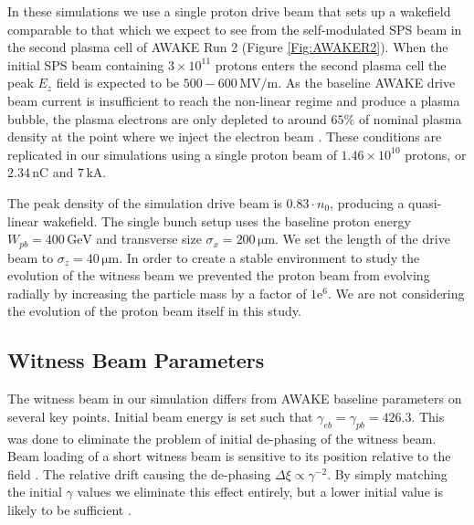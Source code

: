 \documentclass[aps,prstab,reprint,amsmath,amssymb,groupedaddress]{revtex4-1}
\newcommand{\unit}[1]{\,\mathrm{#1}}
\newcommand{\funit}[2]{\,\mathrm{#1}/\mathrm{#2}}
\newcommand{\mexp}[1]{\mathrm{e}^{#1}}
\newcommand{\nexp}[1]{\times 10^{#1}}
\begin{document}
In these simulations we use a single proton drive beam that sets up a wakefield comparable to that which we expect to
see from the self-modulated SPS beam in the second plasma cell of AWAKE Run 2 (Figure \ref{Fig:AWAKER2}). When the
initial SPS beam containing $3\nexp{11}$ protons \cite{gschwendtner:2016} enters the second plasma cell the peak $E_{z}$
field is expected to be $500-600\funit{MV}{m}$. As the baseline AWAKE drive beam current is insufficient to reach the
non-linear regime and produce a plasma bubble, the plasma electrons are only depleted to around $65\%$ of nominal plasma
density at the point where we inject the electron beam \cite{awake_collaboration:2016}. These conditions are replicated
in our simulations using a single proton beam of $1.46\nexp{10}$ protons, or $2.34\unit{nC}$ and $7\unit{kA}$.

The peak density of the simulation drive beam is $0.83\cdot n_{0}$, producing a quasi-linear wakefield. The single bunch
setup uses the baseline proton energy $W_{pb} = 400\unit{GeV}$ and transverse size $\sigma_{x} = 200\unit{\mu m}$. We
set the length of the drive beam to $\sigma_{z} = 40\unit{\mu m}$. In order to create a stable environment to study the
evolution of the witness beam we prevented the proton beam from evolving radially by increasing the particle mass by a
factor of $1\mexp{6}$. We are not considering the evolution of the proton beam itself in this study.

\subsection[\label{S:M:Setup}]{Witness Beam Parameters}

The witness beam in our simulation differs from AWAKE baseline parameters on several key points. Initial beam energy is
set such that $\gamma_{eb} = \gamma_{pb} = 426.3$. This was done to eliminate the problem of initial de-phasing of the
witness beam. Beam loading of a short witness beam is sensitive to its position relative to the field
\cite{tzoufras:2009}. The relative drift causing the de-phasing $\Delta\xi \propto \gamma^{-2}$. By simply matching the
initial $\gamma$ values we eliminate this effect entirely, but a lower initial value is likely to be sufficient
\cite{berglyd_olsen:2015}.
\end{document}
